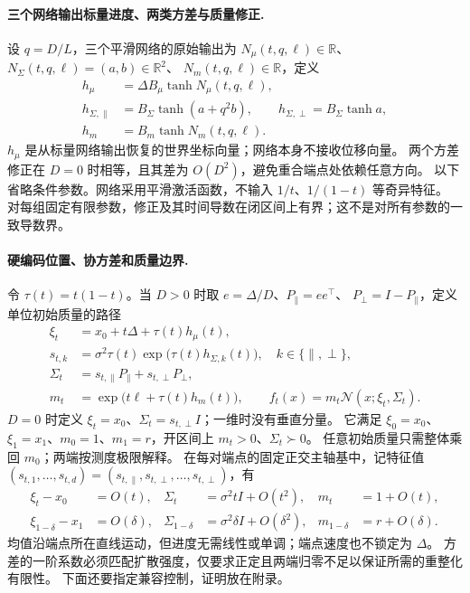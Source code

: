 \documentclass[UTF8,a4paper,11pt,fontset=fandol]{ctexart}
\begin{document}
\paragraph{三个网络输出标量进度、两类方差与质量修正.}
设 $q=D/L$，三个平滑网络的原始输出为
$N_\mu(t,q,\ell)\in\mathbb R$、$N_\Sigma(t,q,\ell)=(a,b)\in\mathbb R^2$、
$N_m(t,q,\ell)\in\mathbb R$，定义
\begin{equation}
\begin{aligned}
h_\mu&=\Delta B_\mu\tanh N_\mu(t,q,\ell),\\
h_{\Sigma,\parallel}&=B_\Sigma\tanh(a+q^2b),\qquad
h_{\Sigma,\perp}=B_\Sigma\tanh a,\\
h_m&=B_m\tanh N_m(t,q,\ell).
\end{aligned}
\label{eq:three-time-conditioned-networks}
\end{equation}
$h_\mu$ 是从标量网络输出恢复的世界坐标向量；网络本身不接收位移向量。
两个方差修正在 $D=0$ 时相等，且其差为 $O(D^2)$，避免重合端点处依赖任意方向。
以下省略条件参数。网络采用平滑激活函数，不输入 $1/t$、$1/(1-t)$ 等奇异特征。
对每组固定有限参数，修正及其时间导数在闭区间上有界；这不是对所有参数的一致导数界。

\paragraph{硬编码位置、协方差和质量边界.}
令 $\tau(t)=t(1-t)$。当 $D>0$ 时取 $e=\Delta/D$、$P_\parallel=ee^\top$、
$P_\perp=I-P_\parallel$，定义单位初始质量的路径
\begin{equation}
\boxed{\begin{aligned}
\xi_t&=x_0+t\Delta+\tau(t)h_\mu(t),\\
s_{t,k}&=\sigma^2\tau(t)\exp\!\bigl(\tau(t)h_{\Sigma,k}(t)\bigr),
\quad k\in\{\parallel,\perp\},\\
\Sigma_t&=s_{t,\parallel}P_\parallel+s_{t,\perp}P_\perp,\\
m_t&=\exp\!\bigl(t\ell+\tau(t)h_m(t)\bigr),\qquad
f_t(x)=m_t\mathcal N(x;\xi_t,\Sigma_t).
\end{aligned}}
\label{eq:boundary-safe-gaussian-ansatz}
\end{equation}
$D=0$ 时定义 $\xi_t=x_0$、$\Sigma_t=s_{t,\perp}I$；一维时没有垂直分量。
它满足 $\xi_0=x_0$、$\xi_1=x_1$、$m_0=1$、$m_1=r$，开区间上 $m_t>0$、$\Sigma_t\succ0$。
任意初始质量只需整体乘回 $m_0$；两端按测度极限解释。
在每对端点的固定正交主轴基中，记特征值
$(s_{t,1},\ldots,s_{t,d})=(s_{t,\parallel},s_{t,\perp},\ldots,s_{t,\perp})$，有
\begin{equation}
\begin{aligned}
\xi_t-x_0&=O(t),&\Sigma_t&=\sigma^2tI+O(t^2),&m_t&=1+O(t),\\
\xi_{1-\delta}-x_1&=O(\delta),&
\Sigma_{1-\delta}&=\sigma^2\delta I+O(\delta^2),&m_{1-\delta}&=r+O(\delta).
\end{aligned}
\label{eq:gaussian-endpoint-orders}
\end{equation}
均值沿端点所在直线运动，但进度无需线性或单调；端点速度也不锁定为 $\Delta$。
方差的一阶系数必须匹配扩散强度，仅要求正定且两端归零不足以保证所需的重整化有限性。
下面还要指定兼容控制，证明放在附录。
\end{document}
